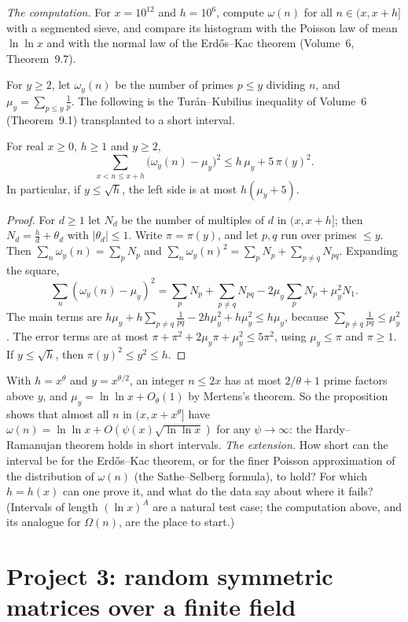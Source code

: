 \emph{The computation.} For $x=10^{12}$ and $h=10^6$, compute $\omega(n)$ for all $n\in(x,x+h]$ with a segmented sieve, and compare its histogram with the Poisson law of mean $\ln\ln x$ and with the normal law of the Erd\H os--Kac theorem (Volume~6, Theorem~9.7).

For $y\ge2$, let $\omega_y(n)$ be the number of primes $p\le y$ dividing $n$, and $\mu_y=\sum_{p\le y}\frac1p$. The following is the Tur\'an--Kubilius inequality of Volume~6 (Theorem~9.1) transplanted to a short interval.

\begin{proposition}\label{prop:tkshort}
For real $x\ge0$, $h\ge1$ and $y\ge2$,
\[
\sum_{x<n\le x+h}\bigl(\omega_y(n)-\mu_y\bigr)^2\le h\,\mu_y+5\,\pi(y)^2.
\]
In particular, if $y\le\sqrt h$, the left side is at most $h(\mu_y+5)$.
\end{proposition}

\begin{proof}
For $d\ge1$ let $N_d$ be the number of multiples of $d$ in $(x,x+h]$; then $N_d=\frac hd+\theta_d$ with $|\theta_d|\le1$. Write $\pi=\pi(y)$, and let $p,q$ run over primes $\le y$. Then $\sum_n\omega_y(n)=\sum_pN_p$ and $\sum_n\omega_y(n)^2=\sum_pN_p+\sum_{p\ne q}N_{pq}$. Expanding the square,
\[
\sum_n(\omega_y(n)-\mu_y)^2=\sum_pN_p+\sum_{p\ne q}N_{pq}-2\mu_y\sum_pN_p+\mu_y^2N_1.
\]
The main terms are $h\mu_y+h\sum_{p\ne q}\frac1{pq}-2h\mu_y^2+h\mu_y^2\le h\mu_y$, because $\sum_{p\ne q}\frac1{pq}\le\mu_y^2$. The error terms are at most $\pi+\pi^2+2\mu_y\pi+\mu_y^2\le5\pi^2$, using $\mu_y\le\pi$ and $\pi\ge1$. If $y\le\sqrt h$, then $\pi(y)^2\le y^2\le h$.
\end{proof}

With $h=x^\theta$ and $y=x^{\theta/2}$, an integer $n\le2x$ has at most $2/\theta+1$ prime factors above $y$, and $\mu_y=\ln\ln x+O_\theta(1)$ by Mertens's theorem. So the proposition shows that almost all $n$ in $(x,x+x^\theta]$ have $\omega(n)=\ln\ln x+O(\psi(x)\sqrt{\ln\ln x})$ for any $\psi\to\infty$: the Hardy--Ramanujan theorem holds in short intervals. \emph{The extension.} How short can the interval be for the Erd\H os--Kac theorem, or for the finer Poisson approximation of the distribution of $\omega(n)$ (the Sathe--Selberg formula), to hold? For which $h=h(x)$ can one prove it, and what do the data say about where it fails? (Intervals of length $(\ln x)^A$ are a natural test case; the computation above, and its analogue for $\Omega(n)$, are the place to start.)

\section{Project 3: random symmetric matrices over a finite field}


